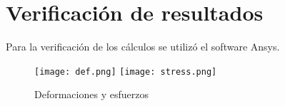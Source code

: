 \documentclass[12pt,a3paper]{article}
\begin{document}
\section{Verificación de resultados}
Para la verificación de los cálculos se utilizó el software Ansys.
\begin{figure}[H]
\begin{center}
\texttt{[image: def.png]}
\texttt{[image: stress.png]}
\caption{Deformaciones y esfuerzos}
\end{center}
\end{figure}
\end{document}
